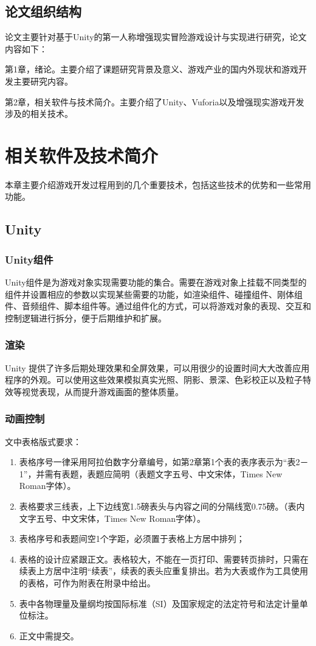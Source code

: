 \documentclass[12pt]{graduate-design-manual}
\begin{document}
\subsection{论文组织结构}
论文主要针对基于Unity的第一人称增强现实冒险游戏设计与实现进行研究，论文内容如下：

第1章，绪论。主要介绍了课题研究背景及意义、游戏产业的国内外现状和游戏开发主要研究内容。

第2章，相关软件与技术简介。主要介绍了Unity、Vuforia以及增强现实游戏开发涉及的相关技术。

\section{相关软件及技术简介}
本章主要介绍游戏开发过程用到的几个重要技术，包括这些技术的优势和一些常用功能。

\subsection{Unity}
\subsubsection{Unity组件}
Unity组件是为游戏对象实现需要功能的集合。需要在游戏对象上挂载不同类型的组件并设置相应的参数以实现某些需要的功能，如渲染组件、碰撞组件、刚体组件、音频组件、脚本组件等。通过组件化的方式，可以将游戏对象的表现、交互和控制逻辑进行拆分，便于后期维护和扩展。

\subsubsection{渲染}
Unity 提供了许多后期处理效果和全屏效果，可以用很少的设置时间大大改善应用程序的外观。可以使用这些效果模拟真实光照、阴影、景深、色彩校正以及粒子特效等视觉表现，从而提升游戏画面的整体质量。

\subsubsection{动画控制}
文中表格版式要求：
\begin{enumerate}
    \item 表格序号一律采用阿拉伯数字分章编号，如第2章第1个表的表序表示为“表2－1”，并需有表题，表题应简明（表题文字五号、中文宋体，Times New Roman字体）。
    \item 表格要求三线表，上下边线宽1.5磅表头与内容之间的分隔线宽0.75磅。（表内文字五号、中文宋体，Times New Roman字体）。
    \item 表格序号和表题间空1个字距，必须置于表格上方居中排列；
    \item 表格的设计应紧跟正文。表格较大，不能在一页打印、需要转页排时，只需在续表上方居中注明“续表”，续表的表头应重复排出。若为大表或作为工具使用的表格，可作为附表在附录中给出。
    \item 表中各物理量及量纲均按国际标准（SI）及国家规定的法定符号和法定计量单位标注。
    \item 正文中需提交。
\end{enumerate}
\end{document}
